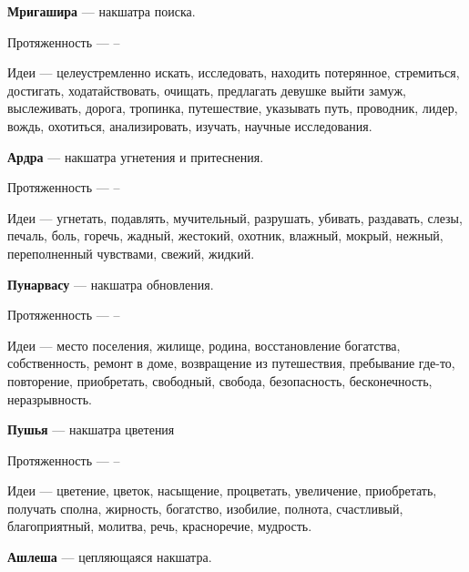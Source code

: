 \begin{myenum}
\begin{mydescr}
		\end{mydescr}
	\item \textbf{Мригашира} --- накшатра поиска.
		\begin{mydescr}
			\item[Протяженность] ---  -- 
			\item[Идеи] --- целеустремленно искать, исследовать, находить потерянное, стремиться, достигать, ходатайствовать, очищать, предлагать девушке выйти замуж, выслеживать, дорога, тропинка, путешествие, указывать путь, проводник, лидер, вождь, охотиться, анализировать, изучать, научные исследования.
		\end{mydescr}
	\item \textbf{Ардра} --- накшатра угнетения и притеснения.
		\begin{mydescr}
			\item[Протяженность] ---  -- \signum{20}{}{\gemini}
			\item[Идеи] --- угнетать, подавлять, мучительный, разрушать, убивать, раздавать, слезы, печаль, боль, горечь, жадный, жестокий, охотник, влажный, мокрый, нежный, переполненный чувствами, свежий, жидкий.
		\end{mydescr}
	\item \textbf{Пунарвасу} --- накшатра обновления.
		\begin{mydescr}
			\item[Протяженность] ---  -- \signum{3}{20}{\cancer}
			\item[Идеи] --- место поселения, жилище, родина, восстановление богатства, собственность, ремонт в доме, возвращение из путешествия, пребывание где-то, повторение, приобретать, свободный, свобода, безопасность, бесконечность, неразрывность.
		\end{mydescr}
	\item \textbf{Пушья} --- накшатра цветения
		\begin{mydescr}
			\item[Протяженность] ---  -- \signum{16}{40}{\cancer}
			\item[Идеи] --- цветение, цветок, насыщение, процветать, увеличение, приобретать, получать сполна, жирность, богатство, изобилие, полнота, счастливый, благоприятный, молитва, речь, красноречие, мудрость.
		\end{mydescr}
	\item \textbf{Ашлеша} --- цепляющаяся накшатра.
		\begin{mydescr}

\end{mydescr}
\end{myenum}
